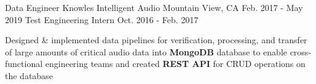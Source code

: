 \begin{cventries}
\cventryupdate
    {Data Engineer} %
    {Knowles Intelligent Audio} %
    {Mountain View, CA} %
    {Feb. 2017 - May 2019} %
    {Test Engineering Intern} %
    {Oct. 2016 - Feb. 2017} %
    {
      \begin{cvitems} %
 		\item {Designed \& implemented data pipelines for verification, processing, and transfer of large amounts of critical audio data into \textbf{MongoDB} database to enable cross-functional engineering teams and created \textbf{REST API} for CRUD operations on the database}
      \end{cvitems}
    }

\end{cventries}
